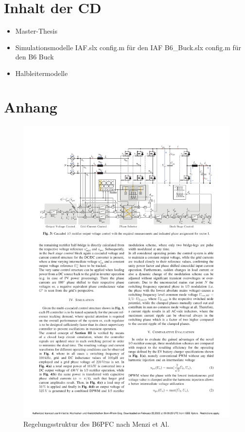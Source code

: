 \chapter{Inhalt der CD}

\begin{itemize}
	\item Master-Thesis
	\item Simulationsmodelle
		\subitem IAF.slx
		\subitem config.m für den IAF
		\subitem B6\_Buck.slx
		\subitem config.m für den B6 Buck
	
	\item Halbleitermodelle
\end{itemize}

\chapter{Anhang}

\setcounter{figure}{0}
\renewcommand{\thefigure}{A\arabic{figure}}

\setcounter{table}{0}
\renewcommand{\thetable}{A\arabic{table}}

\begin{figure}[H]
	\centering
	\includegraphics[width=0.65\linewidth]{content/Anhang/B6_Regelung}
	\caption{Regelungsstruktur des \gls{B6PFC} nach Menzi et Al. \cite{13PWMPFC}}
	\label{fig:b6regelung}
\end{figure}



